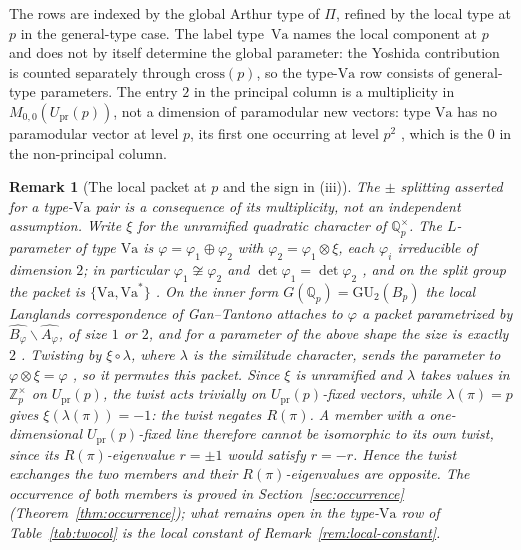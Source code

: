 \documentclass[10pt,a4paper]{amsart}
\newtheorem{remark}[theorem]{Remark}
\newcommand{\Q}{\mathbb{Q}}
\newcommand{\Z}{\mathbb{Z}}
\newcommand{\GU}{\mathrm{GU}}
\newcommand{\Upr}{U_{\mathrm{pr}}}
\newcommand{\Va}{\mathrm{Va}}
\providecommand{\Upr}{U_{\mathrm{pr}}}
\providecommand{\Va}{\mathrm{Va}}
\begin{document}
	The rows are indexed by the global Arthur type of $\Pi$, refined by the
	local type at $p$ in the general-type case. The label type~$\Va$ names the
	local component at $p$ and does not by itself determine the global
	parameter: the Yoshida contribution is counted separately through
	$\mathrm{cross}(p)$, so the type-$\Va$ row consists of general-type
	parameters. The entry $2$ in the principal column is a multiplicity in
	$M_{0,0}(\Upr(p))$, not a dimension of paramodular new vectors: type
	$\Va$ has no paramodular vector at level $p$, its first one occurring at
	level $p^{2}$ \cite[Table~5.2]{RobertsSchmidtTables}, which is the $0$ in
	the non-principal column.
	
	\begin{remark}[The local packet at $p$ and the sign in
		\textup{(iii)}]
		\label{rem:localpacket}
		The $\pm$ splitting asserted for a type-$\Va$ pair is a consequence of
		its multiplicity, not an independent assumption. Write $\xi$ for the
		unramified quadratic character of $\Q_p^\times$. The $L$-parameter of
		type $\Va$ is $\varphi=\varphi_1\oplus\varphi_2$ with
		$\varphi_2=\varphi_1\otimes\xi$, each $\varphi_i$ irreducible of
		dimension $2$; in particular $\varphi_1\not\cong\varphi_2$ and
		$\det\varphi_1=\det\varphi_2$
		\cite[Tables~3.1--3.2]{RobertsSchmidtTables}, and on the split group the
		packet is $\{\Va,\Va^{*}\}$ \cite[\S3]{Schmidt2018}. On the inner form
		$G(\Q_p)=\GU_2(B_p)$ the local Langlands correspondence of
		Gan--Tantono attaches to $\varphi$ a packet parametrized by
		$\widehat{B_\varphi}\smallsetminus\widehat{A_\varphi}$, of size $1$ or
		$2$, and for a parameter of the above shape the size is exactly $2$
		\cite[Main Thm.~(ii), \S7.2]{GanTantono}. Twisting by $\xi\circ\lambda$,
		where $\lambda$ is the similitude character, sends the parameter to
		$\varphi\otimes\xi=\varphi$
		\cite[Main Thm.~(iv)]{GanTantono}, so it permutes this packet. Since
		$\xi$ is unramified and $\lambda$ takes values in $\Z_p^\times$ on
		$\Upr(p)$, the twist acts trivially on $\Upr(p)$-fixed vectors, while
		$\lambda(\pi)=p$ gives $\xi(\lambda(\pi))=-1$: the twist negates
		$R(\pi)$. A member with a one-dimensional $\Upr(p)$-fixed line therefore
		cannot be isomorphic to its own twist, since its $R(\pi)$-eigenvalue
		$r=\pm1$ would satisfy $r=-r$. Hence the twist exchanges the two members
		and their $R(\pi)$-eigenvalues are opposite. The occurrence of both members is proved in
		Section~\ref{sec:occurrence} (Theorem~\ref{thm:occurrence}); what
		remains open in the type-$\Va$ row of Table~\ref{tab:twocol} is the
		local constant of Remark~\ref{rem:local-constant}.
	\end{remark}
	
\end{document}
